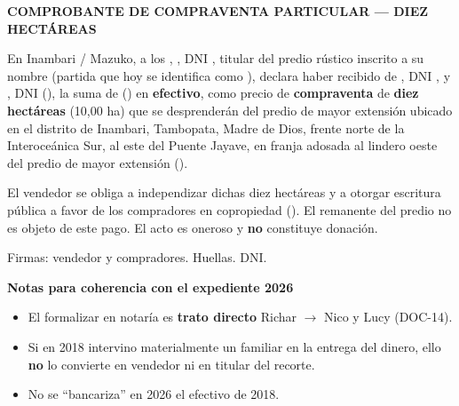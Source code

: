 \documentclass[12pt,a4paper]{article}
\begin{document}



\vspace{0.4em}
\noindent\textbf{COMPROBANTE DE COMPRAVENTA PARTICULAR --- DIEZ HECTÁREAS}

\vspace{0.25em}
\noindent En Inambari / Mazuko, a los \FechaPago, \textbf{\VendedorNombreCompleto}, DNI \VendedorDNI, titular del predio rústico inscrito a su nombre (partida que hoy se identifica como \PartidaMatriz), declara haber recibido de \textbf{\CompradorUnoNombre}, DNI \CompradorUnoDNI, y \textbf{\CompradorDosNombre}, DNI \CompradorDosDNI (\CompradorParentesco), la suma de \textbf{\MontoPago} (\MontoPagoLetras) en \textbf{efectivo}, como precio de \textbf{compraventa} de \textbf{diez hectáreas} (10,00 ha) que se desprenderán del predio de mayor extensión ubicado en el distrito de Inambari, Tambopata, Madre de Dios, frente norte de la Interoceánica Sur, al este del Puente Jayave, en franja adosada al lindero oeste del predio de mayor extensión (\CriterioRecorte).

\vspace{0.2em}
\noindent El vendedor se obliga a independizar dichas diez hectáreas y a otorgar escritura pública a favor de los compradores en copropiedad (\PorcentajeCopropiedad). El remanente del predio no es objeto de este pago. El acto es oneroso y \textbf{no} constituye donación.

\vspace{0.2em}
\noindent Firmas: vendedor y compradores. Huellas. DNI.

\vspace{0.45em}
\noindent\textbf{Notas para coherencia con el expediente 2026}
\begin{itemize}[leftmargin=1.15cm]
\item El formalizar en notaría es \textbf{trato directo} Richar $\rightarrow$ Nico y Lucy (DOC-14).
\item Si en 2018 intervino materialmente un familiar en la entrega del dinero, ello \textbf{no} lo convierte en vendedor ni en titular del recorte.
\item No se ``bancariza'' en 2026 el efectivo de 2018.
\end{itemize}

\LugarFecha
{}
\end{document}
